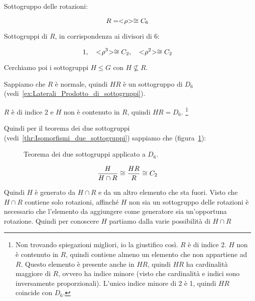 Sottogruppo delle rotazioni:

\begin{equation}
	R = < \negmedspace \rho \negmedspace > \cong C_6
\end{equation}

Sottogruppi di $R$, in corrispondenza ai divisori di 6:

\begin{equation}
	1, \quad < \negmedspace \rho^3 \negmedspace > \cong C_2, \quad < \negmedspace \rho^2 \negmedspace > \cong C_2
\end{equation}

Cerchiamo poi i sottogruppi $H \le G$ con $H \not\subseteq R$.

Sappiamo che $R$ è normale, quindi $HR$ è un sottogruppo di $D_6$ (vedi~\ref{ex:Laterali_Prodotto_di_sottogruppi}). 

$R$ è di indice 2 e $H$ non è contenuto in $R$, quindi $HR = D_6$.
\footnote{
Non trovando spiegazioni migliori, io la giustifico così.
$R$ è di indice 2. $H$ non è contenuto in $R$, quindi contiene almeno un elemento che non appartiene ad $R$. 
Questo elemento è presente anche in $HR$, quindi $HR$ ha cardinalità maggiore di $R$, ovvero ha indice minore (visto che cardinalità e indici sono inversamente proporzionali). L'unico indice minore di 2 è 1, quindi $HR$ coincide con $D_6$.
}

Quindi per il teorema dei due sottogruppi (vedi~\ref{thr:Isomorfismi_due_sottogruppi}) sappiamo che (figura~\ref{fig:Isometrie_due_sottogruppi}):

	\begin{figure}[tp]
	\centering
	\caption{Teorema dei due sottogruppi applicato a $D_6$.}
	\label{fig:Isometrie_due_sottogruppi}
\end{figure}


\begin{equation}
	\dfrac{H}{H \cap R} \cong \dfrac{HR}{R} \cong C_2 
\end{equation}

Quindi $H$ è generato da $H \cap R$ e da un altro elemento che sta fuori. Visto che $H \cap R$ contiene solo rotazioni, affinché $H$ non sia un sottogruppo delle rotazioni è necessario che l'elemento da aggiungere come generatore sia un'opportuna rotazione. Quindi per conoscere $H$ partiamo dalla varie possibilità di $H \cap R$
	
